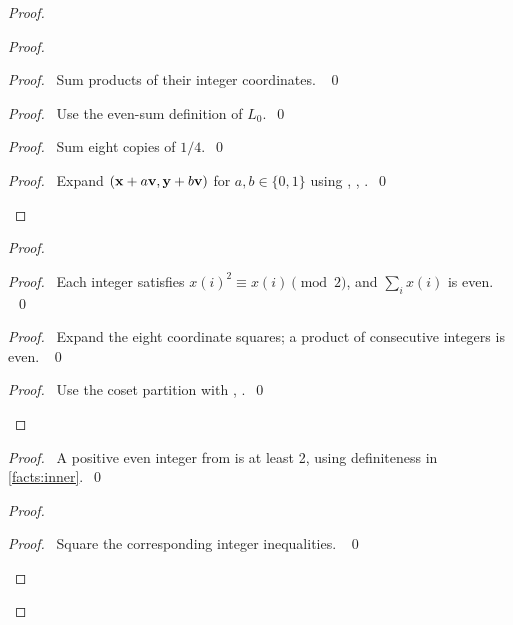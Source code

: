 \begin{proof}
\begin{proof}
\begin{proof}\pf\ Sum products of their integer coordinates. ~\qed\end{proof}
\begin{proof}\pf\ Use the even-sum definition of $L_0$.~\qed\end{proof}
\begin{proof}\pf\ Sum eight copies of $1/4$.~\qed\end{proof}
\qedstep
\begin{proof}\pf\ Expand
$({\mathbf x}+a{\mathbf v},{\mathbf y}+b{\mathbf v})$ for $a,b\in\{0,1\}$ using
, , .~\qed\end{proof}
\end{proof}
\begin{proof}
\begin{proof}\pf\ Each integer satisfies $x(i)^2\equiv x(i)\pmod2$,
and $\sum_i x(i)$ is even. ~\qed\end{proof}
\begin{proof}\pf\ Expand the eight coordinate squares; a product of
consecutive integers is even. ~\qed\end{proof}
\qedstep
\begin{proof}\pf\ Use the coset partition  with
, .~\qed\end{proof}
\end{proof}
\begin{proof}\pf\ A positive even integer from 
is at least 2, using definiteness in \ref{facts:inner}.~\qed\end{proof}
\begin{proof}
\begin{proof}\pf\ Square the corresponding integer inequalities. ~\qed\end{proof}

\end{proof}
\end{proof}
